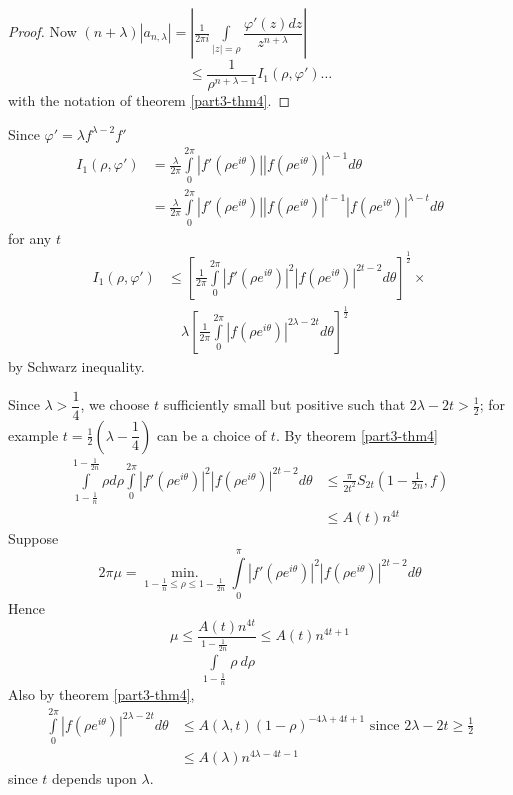 \begin{proof}
Now $(n+\lambda)|a_{n,\lambda}| = \left|\frac{1}{2\pi
  i}\int\limits_{|z|=\rho} \dfrac{\varphi'(z)dz}{z^{n+\lambda}}\right|$ 
\begin{equation*}
\leq \frac{1}{\rho^{n+\lambda-1}}I_{1}(\rho,\varphi')\ldots\tag{3.6}\label{part3-eq3.6} 
\end{equation*}
with the notation of theorem \ref{part3-thm4}.
\end{proof}

Since $\varphi'=\lambda f^{\lambda-2}f'$
\begin{align*}
I_{1}(\rho,\varphi') &= \frac{\lambda}{2\pi}\int\limits^{2\pi}_{0}|f'(\rho e^{i\theta})||f(\rho e^{i\theta})|^{\lambda-1}d\theta\\
&= \frac{\lambda}{2\pi}\int\limits^{2\pi}_{0}|f'(\rho e^{i\theta})||f(\rho e^{i\theta})|^{t-1}|f(\rho e^{i\theta})|^{\lambda-t}d\theta
\end{align*}
for any $t$
\begin{align*}
I_{1}(\rho,\varphi') &\leq \left[\frac{1}{2\pi}\int\limits^{2\pi}_{0}|f'(\rho e^{i\theta})|^{2}|f(\rho e^{i\theta})|^{2t-2}d\theta\right]^{\frac{1}{2}}\times\\
&\quad \lambda \left[\frac{1}{2\pi}\int\limits^{2\pi}_{0}|f(\rho e^{i\theta})|^{2\lambda-2t}d\theta\right]^{\frac{1}{2}}\tag{3.7}\label{part3-eq3.7}
\end{align*}\pageoriginale
by Schwarz inequality.

Since $\lambda>\dfrac{1}{4}$, we choose $t$ sufficiently small but
positive such that $2\lambda-2t>\frac{1}{2}$; for example
$t=\frac{1}{2}(\lambda-\dfrac{1}{4})$ can be a choice of $t$. By
theorem \ref{part3-thm4} 
\begin{align*}
\int\limits^{1-\frac{1}{2n}}_{1-\frac{1}{n}}\rho d\rho
\int\limits^{2\pi}_{0}|f'(\rho e^{i\theta})|^{2}|f(\rho
e^{i\theta})|^{2t-2}d\theta &\leq
\frac{\pi}{2t^{2}}S_{2t}\left(1-\frac{1}{2n},f\right)\\
&\leq A(t)n^{4t}
\end{align*}
Suppose 
$$
2\pi \mu=\mathop{\text{min.}}\limits_{1-\frac{1}{n}\leq \rho\leq
  1-\frac{1}{2n}}\int\limits^{\pi}_{0}|f'(\rho
e^{i\theta})|^{2}|f(\rho e^{i\theta})|^{2t-2}d\theta
$$
Hence
\begin{equation*}
\mu\leq
\frac{A(t)n^{4t}}{\int\limits_{1-\frac{1}{n}}^{1-\frac{1}{2n}}\rho
  \ d\rho} \leq A(t)n^{4t+1}\tag{3.8}\label{part3-eq3.8}
\end{equation*}
Also by theorem \ref{part3-thm4},
\begin{align*}
\int\limits^{2\pi}_{0}|f(\rho e^{i\theta})|^{2\lambda-2t}d\theta &\leq
A(\lambda,t)(1-\rho)^{-4\lambda+4t+1}\text{ since } 2\lambda-2t\geq
\frac{1}{2}\\
&\leq A(\lambda)n^{4\lambda-4t-1}\tag{3.9}\label{part3-eq3.9}
\end{align*}\pageoriginale
since $t$ depends upon $\lambda$.

